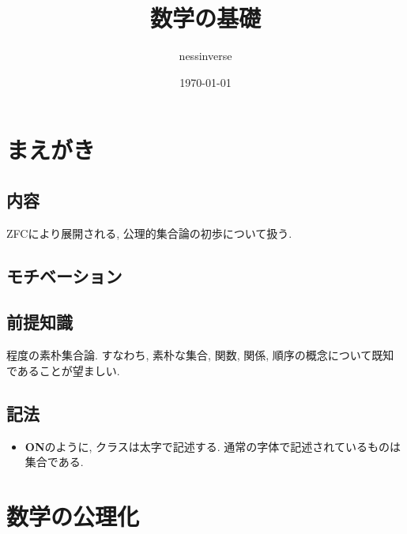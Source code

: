 \documentclass[a4paper]{bxjsarticle}
\title{数学の基礎}
\author{nessinverse}
\date{\today}
\theoremstyle{definition}
\begin{document}
    \maketitle
    
    \section*{まえがき}
    \subsection*{内容}
    ZFCにより展開される, 公理的集合論の初歩について扱う. 
    \subsection*{モチベーション}
    
    \subsection*{前提知識}
    \cite{matsuzaka}程度の素朴集合論. すなわち, 素朴な集合, 関数, 関係, 順序の概念について既知であることが望ましい.
    \subsection*{記法}
    \begin{itemize}
        \item \textbf{ON}のように, クラスは太字で記述する. 通常の字体で記述されているものは集合である.
        
    \end{itemize}
    \newpage
    \tableofcontents
    \newpage    
    
    \section{数学の公理化}
    
\end{document}
